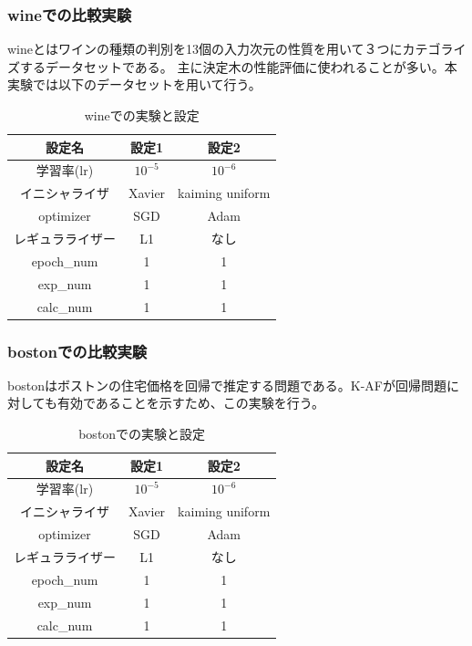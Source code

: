 \subsubsection{wineでの比較実験}
\label{impl:wine}

wineとはワインの種類の判別を13個の入力次元の性質を用いて３つにカテゴライズするデータセットである。
主に決定木の性能評価に使われることが多い。本実験では以下のデータセットを用いて行う。

\begin{table}[htbp]
    \begin{center}
        \caption{wineでの実験と設定}
        \vspace{5mm} 
        \begin{tabular}{ |c|c|c| }
        設定名 & 設定1 & 設定2 \\
        \hline
        学習率(lr)         & $ 10^{-5} $ & $ 10^{-6} $ \\
        イニシャライザ       & Xavier & kaiming uniform \\
        optimizer           & SGD & Adam \\
        レギュラライザー     & L1 & なし \\
        epoch\_num       & 1 &  1 \\
        exp\_num         & 1 & 1 \\
        calc\_num        & 1 & 1 \\
        \end{tabular}
    \end{center}
\end{table}


\subsubsection{bostonでの比較実験}
\label{impl:boston}

bostonはボストンの住宅価格を回帰で推定する問題である。K-AFが回帰問題に対しても有効であることを示すため、この実験を行う。

\begin{table}[htbp]
    \begin{center}
        \caption{bostonでの実験と設定}
        \vspace{5mm} 
        \begin{tabular}{ |c|c|c| }
        設定名 & 設定1 & 設定2 \\
        \hline
        学習率(lr)         & $ 10^{-5} $ & $ 10^{-6} $ \\
        イニシャライザ       & Xavier & kaiming uniform \\
        optimizer           & SGD & Adam \\
        レギュラライザー     & L1 & なし \\
        epoch\_num       & 1 &  1 \\
        exp\_num         & 1 & 1 \\
        calc\_num        & 1 & 1 \\
        \end{tabular}
    \end{center}
\end{table}

